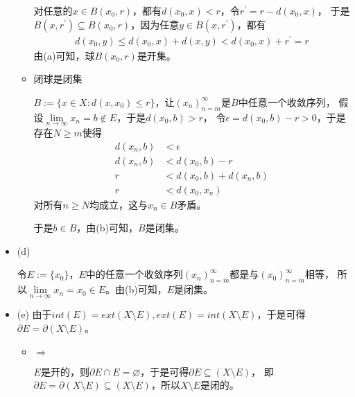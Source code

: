 \documentclass{article}
\begin{document}
\begin{itemize}
\begin{itemize}
                        对任意的$x \in B(x_0, r)$，都有$d(x_0, x) < r$，令$r^\prime = r - d(x_0, x)$，
                        于是$B(x, r^\prime) \subseteq B(x_0, r)$，因为任意$y \in B(x, r^\prime)$，都有
                        \begin{align*}
                              d(x_0, y) \leq d(x_0, x) + d(x, y) < d(x_0, x) + r^\prime = r
                        \end{align*}
                        由(a)可知，球$B(x_0, r)$是开集。

                  \item 闭球是闭集

                        $B := \{x \in X : d(x, x_0) \leq r \}$，让$(x_n)_{n = m}^\infty$是$B$中任意一个收敛序列，
                        假设$\lim\limits_{n \to \infty} x_n = b \notin E$，于是$d(x_0, b) > r$，
                        令$\epsilon = d(x_0, b) - r > 0$，于是存在$N \geq m$使得
                        \begin{align*}
                              d(x_n, b) & < \epsilon              \\
                              d(x_n, b) & < d(x_0, b) - r         \\
                              r         & < d(x_0, b) + d(x_n, b) \\
                              r         & < d(x_0, x_n)
                        \end{align*}
                        对所有$n \geq N$均成立，这与$x_n \in B$矛盾。

                        于是$b \in B$，由(b)可知，$B$是闭集。

            \end{itemize}


      \item (d)

            令$E := \{x_0\}$，$E$中的任意一个收敛序列$(x_n)_{n = m}^\infty$都是与$(x_0)_{n=m}^\infty$相等，
            所以$\lim\limits_{n \to \infty} x_n = x_0 \in E$。由(b)可知，$E$是闭集。

      \item (e)
            由于$int(E) = ext(X \setminus E), ext(E) = int(X \setminus E)$，于是可得$\partial E = \partial (X \setminus E)$。
            \begin{itemize}
                  \item $\Rightarrow$

                        $E$是开的，则$\partial E \cap E = \varnothing$，于是可得$\partial E \subseteq (X \setminus E)$，
                        即$\partial E = \partial (X \setminus E) \subseteq (X \setminus E)$，所以$X \setminus E$是闭的。


\end{itemize}
\end{itemize}
\end{document}
